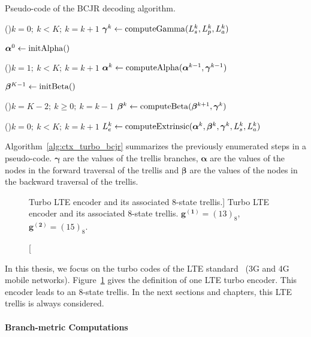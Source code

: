 \begin{algorithm}
  \caption{Pseudo-code of the BCJR decoding algorithm.}
  \label{alg:ctx_turbo_bcjr}

  \For(){$k=0;~k<K;~k=k+1$}
  {
    $\boldsymbol{\gamma}^k\gets \operatorname*{computeGamma}(L_{s}^k, L_{p}^k, L_{a}^k)$
  }

  $\boldsymbol{\alpha}^0\gets \operatorname*{initAlpha}()$

  \For(){$k=1;~k<K;~k=k+1$}
  {
    $\boldsymbol{\alpha}^k\gets \operatorname*{computeAlpha}(\boldsymbol{\alpha}^{k-1}, \boldsymbol{\gamma}^{k-1})$
  }

  $\boldsymbol{\beta}^{K-1}\gets \operatorname*{initBeta}()$

  \For(){$k=K-2;~k \geq 0;~k=k-1$}
  {
    $\boldsymbol{\beta}^k\gets \operatorname*{computeBeta}(\boldsymbol{\beta}^{k+1}, \boldsymbol{\gamma}^{k})$
  }

  \For(){$k=0;~k<K;~k=k+1$}
  {
    $L_e^k\gets \operatorname*{computeExtrinsic}(\boldsymbol{\alpha}^k, \boldsymbol{\beta}^{k}, \boldsymbol{\gamma}^{k}, L_{s}^k, L_{a}^k)$
  }
\end{algorithm}

Algorithm~\ref{alg:ctx_turbo_bcjr} summarizes the previously enumerated steps in
a pseudo-code. $\bm{\gamma}$ are the values of the trellis branches,
$\bm{\alpha}$ are the values of the nodes in the forward traversal of the
trellis and $\bm{\beta}$ are the values of the nodes in the backward traversal
of the trellis.

\begin{figure}[htp]
  \centering
  \caption
    [Turbo LTE encoder and its associated 8-state trellis.]
    {Turbo LTE encoder and its associated 8-state trellis.
     $\bm{g^{(1)}} = (13)_8$, $\bm{g^{(2)}} = (15)_8$.}
  \label{fig:ctx_turbo_encoder_lte}
\end{figure}

In this thesis, we focus on the turbo codes of the LTE standard~\cite{ETSI2013}
(3G and 4G mobile networks). Figure~\ref{fig:ctx_turbo_encoder_lte} gives the
definition of one LTE turbo encoder. This encoder leads to an 8-state trellis.
In the next sections and chapters, this LTE trellis is always considered.

\paragraph{Branch-metric Computations}

